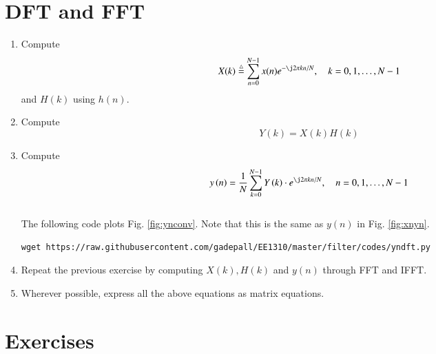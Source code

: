 \documentclass[journal,12pt,twocolumn]{IEEEtran}
\renewcommand\thesection{\arabic{section}}
\begin{document}
\section{DFT and FFT}
\begin{enumerate}[label=\thesection.\arabic*]
\item
Compute
\begin{equation}
X(k) \define \sum _{n=0}^{N-1}x(n) e^{-\j2\pi kn/N}, \quad k = 0,1,\dots, N-1
\end{equation}
and $H(k)$ using $h(n)$.
\item Compute 
\begin{equation}
Y(k) = X(k)H(k)
\end{equation}
\item Compute
\begin{equation}
 y\brak{n}={\frac {1}{N}}\sum _{k=0}^{N-1}Y\brak{k}\cdot e^{\j 2\pi kn/N},\quad n = 0,1,\dots, N-1
\end{equation}
\\
\solution The following code plots Fig. \ref{fig:ynconv}. Note that this is the same as 
$y(n)$ in  Fig. 
\ref{fig:xnyn}. 
%
\begin{lstlisting}
wget https://raw.githubusercontent.com/gadepall/EE1310/master/filter/codes/yndft.py
\end{lstlisting}

\item Repeat the previous exercise by computing $X(k), H(k)$ and $y(n)$ through FFT and 
IFFT.
\item Wherever possible, express all the above equations as matrix equations.
\end{enumerate}
%
\section{Exercises}
\end{document}
